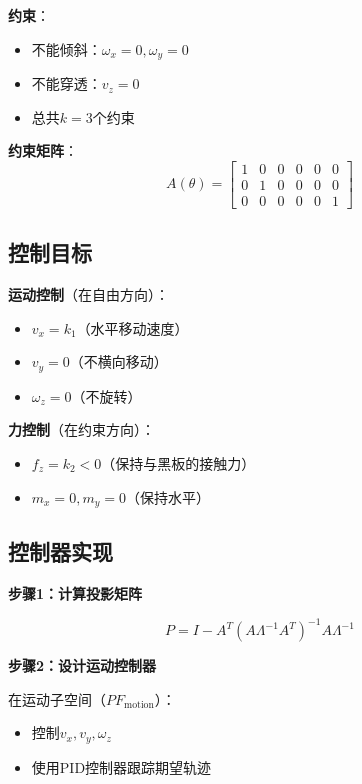 \documentclass[12pt,a4paper]{article}
\begin{document}
\textbf{约束}：
\begin{itemize}
\item 不能倾斜：$\omega_x = 0, \omega_y = 0$
\item 不能穿透：$v_z = 0$
\item 总共$k = 3$个约束
\end{itemize}

\textbf{约束矩阵}：
\begin{equation}
A(\theta) = \begin{bmatrix}
1 & 0 & 0 & 0 & 0 & 0 \\
0 & 1 & 0 & 0 & 0 & 0 \\
0 & 0 & 0 & 0 & 0 & 1
\end{bmatrix}
\end{equation}

\subsection{控制目标}

\textbf{运动控制}（在自由方向）：
\begin{itemize}
\item $v_x = k_1$（水平移动速度）
\item $v_y = 0$（不横向移动）
\item $\omega_z = 0$（不旋转）
\end{itemize}

\textbf{力控制}（在约束方向）：
\begin{itemize}
\item $f_z = k_2 < 0$（保持与黑板的接触力）
\item $m_x = 0, m_y = 0$（保持水平）
\end{itemize}

\subsection{控制器实现}

\textbf{步骤1：计算投影矩阵}

\begin{equation}
P = I - A^T(A\Lambda^{-1}A^T)^{-1}A\Lambda^{-1}
\end{equation}

\textbf{步骤2：设计运动控制器}

在运动子空间（$PF_{\text{motion}}$）：
\begin{itemize}
\item 控制$v_x, v_y, \omega_z$
\item 使用PID控制器跟踪期望轨迹
\end{itemize}
\end{document}
